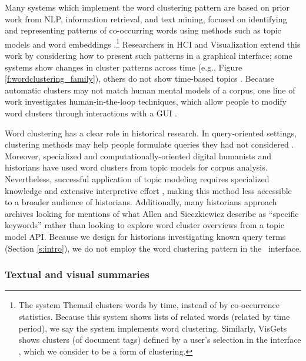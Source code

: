 Many systems which implement the word clustering pattern are based on prior work from NLP, information retrieval, and text mining, focused on identifying and representing patterns of co-occurring words using methods such as topic models \cite{blei2003latent} and word embeddings \cite{word2vec}.\footnote{The system Themail \cite{themail} clusters words by time, instead of by co-occurrence statistics.
Because this system shows lists of related words (related by time period), we say the system implements word clustering.
Similarly, VisGets shows clusters (of document tags) defined by a user's selection in the interface \cite{visgets}, which we consider to be a form of clustering.}
Researchers in HCI and Visualization extend this work by considering how to present such patterns in a graphical interface;
some systems show changes in cluster patterns across time \cite{tiara,HierarchicalTopics,textflow} (e.g., Figure \ref{f:wordclustering_family}), others do not show time-based topics \cite{termite,overview}. 
Because automatic clusters may not match human mental models of a corpus, one line of work investigates human-in-the-loop techniques, which allow people to modify word clusters through interactions with a GUI \cite{Interactive_Topic_Modeling, tiisclusterone, tiisclustertwo, tiisclusterthree, architext, topiclens, starspire}.

Word clustering has a clear role in historical research.
In query-oriented settings, clustering methods may help people formulate queries they had not considered \cite{Underwood}. 
Moreover, specialized and computationally-oriented digital humanists \cite{poetics_issue} and historians \cite{programminghistorianldatutorial} have used word clusters from topic models for corpus analysis.
Nevertheless, successful application of topic modeling requires specialized knowledge and extensive interpretive effort \cite{Baumer,schmidt2012words}, making this method less accessible to a broader audience of historians.  
Additionally, many historians approach archives looking for mentions of what Allen and Sieczkiewicz describe as ``specific keywords'' \cite{allen} rather than looking to explore word cluster overviews from a topic model API.
Because we design for historians investigating known query terms (Section \ref{s:intro}), we do not employ the word clustering pattern in the \ours~interface.

\subsubsection{\textbf{Textual and visual summaries}}\label{s:textual_summary_family}

